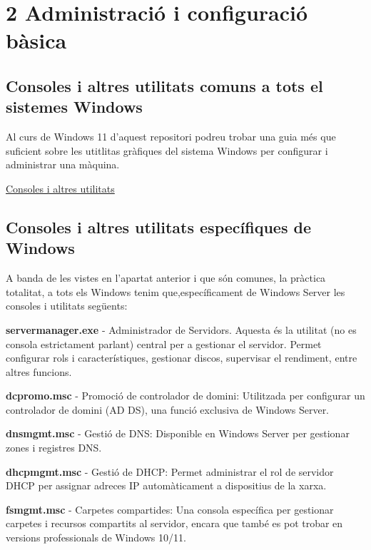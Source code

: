 \documentclass[
  a4paper,
]{article}
\begin{document}
\section{2 Administració i configuració
bàsica}\label{administraciuxf3-i-configuraciuxf3-buxe0sica}

\subsection{Consoles i altres utilitats comuns a tots el sistemes
Windows}\label{consoles-i-altres-utilitats-comuns-a-tots-el-sistemes-windows}

Al curs de Windows 11 d'aquest repositori podreu trobar una guia més que
suficient sobre les utitlitas gràfiques del sistema Windows per
configurar i administrar una màquina.

\href{https://tofermos.github.io/Windows11/gestiodelequip/gestiodelequip.html}{Consoles
i altres utilitats}

\subsection{Consoles i altres utilitats específiques de
Windows}\label{consoles-i-altres-utilitats-especuxedfiques-de-windows}

A banda de les vistes en l'apartat anterior i que són comunes, la
pràctica totalitat, a tots els Windows tenim que,específicament de
Windows Server les consoles i utilitats següents:

\textbf{servermanager.exe} - Administrador de Servidors. Aquesta és la
utilitat (no es consola estrictament parlant) central per a gestionar el
servidor. Permet configurar rols i característiques, gestionar discos,
supervisar el rendiment, entre altres funcions.

\textbf{dcpromo.msc} - Promoció de controlador de domini: Utilitzada per
configurar un controlador de domini (AD DS), una funció exclusiva de
Windows Server.

\textbf{dnsmgmt.msc} - Gestió de DNS: Disponible en Windows Server per
gestionar zones i registres DNS.

\textbf{dhcpmgmt.msc} - Gestió de DHCP: Permet administrar el rol de
servidor DHCP per assignar adreces IP automàticament a dispositius de la
xarxa.

\textbf{fsmgmt.msc} - Carpetes compartides: Una consola específica per
gestionar carpetes i recursos compartits al servidor, encara que també
es pot trobar en versions professionals de Windows 10/11.
\end{document}

